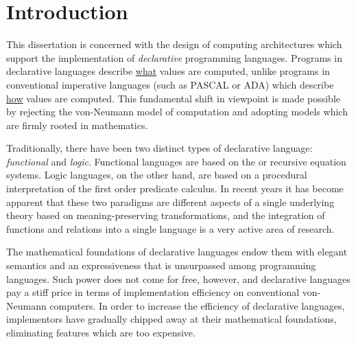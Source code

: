 \chapter{Introduction}

This dissertation is concerned with the design of computing architectures which
support the implementation of \emph{declarative} programming languages. Programs
in declarative languages describe \underline{what} values are computed, unlike
programs in conventional imperative languages (such as PASCAL or ADA) which
describe \underline{how} values are computed. This fundamental shift in viewpoint is
made possible by rejecting the von-Neumann model of computation and adopting
models which are firmly rooted in mathematics.

Traditionally, there have been two distinct types of declarative language:
\emph{functional} and \emph{logic}. Functional languages are based on the
\lambdacalculus{} or recursive equation systems. Logic languages, on the other
hand, are based on a procedural interpretation of the first order predicate
calculus. In recent years it has become apparent that these two paradigms are
different aspects of a single underlying theory based on meaning-preserving
transformations, and the integration of functions and relations into a single
language is a very active area of research.

The mathematical foundations of declarative languages endow them with elegant
semantics and an expressiveness that is unsurpassed among programming languages.
Such power does not come for free, however, and declarative languages pay a stiff
price in terms of implementation efficiency on conventional von-Neumann
computers. In order to increase the efficiency of declarative languages,
implementors have gradually chipped away at their mathematical foundations,
eliminating features which are too expensive.

